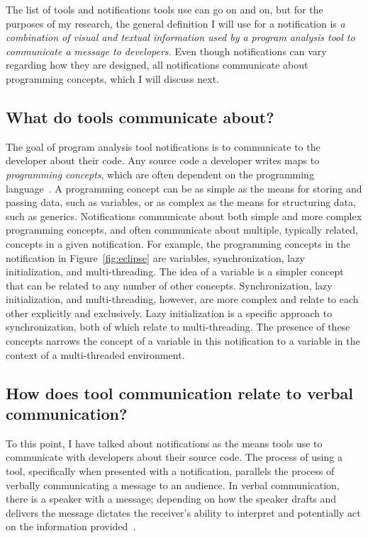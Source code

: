 \documentclass{llncs}
\begin{document}
The list of tools and notifications tools use can go on and on, but for the purposes of my research, the general definition I will use for a notification is \emph{a combination of visual and textual information used by a program analysis tool to communicate a message to developers.} Even though notifications can vary regarding how they are designed, all notifications communicate about programming concepts, which I will discuss next.

\subsection{What do tools communicate about?}

The goal of program analysis tool notifications is to communicate to the developer about their code. Any source code a developer writes maps to \emph{programming concepts}, which are often dependent on the programming language~\cite{jazayeri1997programming}. A programming concept can be as simple as the means for storing and passing data, such as variables, or as complex as the means for structuring data, such as generics. Notifications communicate about both simple and more complex programming concepts, and often communicate about multiple, typically related, concepts in a given notification. For example, the programming concepts in the notification in Figure~\ref{fig:eclipse} are variables, synchronization, lazy initialization, and multi-threading. The idea of a variable is a simpler concept that can be related to any number of other concepts. Synchronization, lazy initialization, and multi-threading, however, are more complex and relate to each other explicitly and exclusively. Lazy initialization is a specific approach to synchronization, both of which relate to multi-threading. The presence of these concepts narrows the concept of a variable in this notification to a variable in the context of a multi-threaded environment. 


\subsection{How does tool communication relate to verbal communication?}
To this point, I have talked about notifications as the means tools use to communicate with developers about their source code.
The process of using a tool, specifically when presented with a notification, parallels the process of verbally communicating a message to an audience.
In verbal communication, there is a speaker with a message; depending on how the speaker drafts and delivers the message dictates the receiver's ability to interpret and potentially act on the information provided~\cite{mustajoki2008modelling,bowman1987modeling}.
\end{document}
